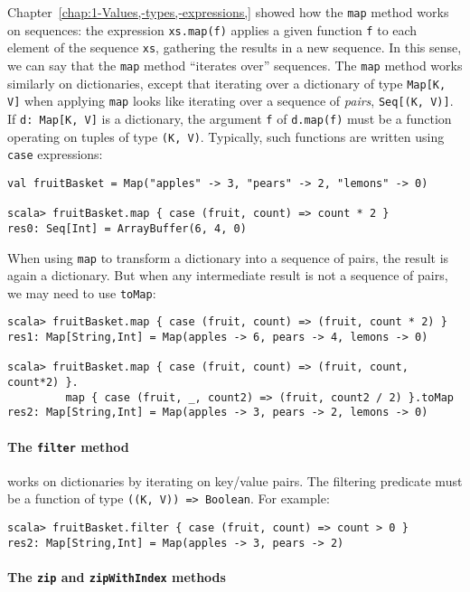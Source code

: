 Chapter~\ref{chap:1-Values,-types,-expressions,} showed how the
\lstinline!map! method works on sequences: the expression \lstinline!xs.map(f)!
applies a given function \lstinline!f! to each element of the sequence
\lstinline!xs!, gathering the results in a new sequence. In this
sense, we can say that the \lstinline!map! method \textsf{``}iterates over\textsf{''}
sequences. The \lstinline!map! method works similarly on dictionaries,
except that iterating over a dictionary of type \lstinline!Map[K, V]!
when applying \lstinline!map! looks like iterating over a sequence
of \emph{pairs}, \lstinline!Seq[(K, V)]!. If \lstinline!d: Map[K, V]!
is a dictionary, the argument \lstinline!f! of \lstinline!d.map(f)!
must be a function operating on tuples of type \lstinline!(K, V)!.
Typically, such functions are written using \lstinline!case! expressions:
\begin{lstlisting}
val fruitBasket = Map("apples" -> 3, "pears" -> 2, "lemons" -> 0)

scala> fruitBasket.map { case (fruit, count) => count * 2 }
res0: Seq[Int] = ArrayBuffer(6, 4, 0)
\end{lstlisting}
When using \lstinline!map! to transform a dictionary into a sequence
of pairs, the result is again a dictionary. But when any intermediate
result is not a sequence of pairs, we may need to use \lstinline!toMap!:
\begin{lstlisting}
scala> fruitBasket.map { case (fruit, count) => (fruit, count * 2) }
res1: Map[String,Int] = Map(apples -> 6, pears -> 4, lemons -> 0)

scala> fruitBasket.map { case (fruit, count) => (fruit, count, count*2) }.
         map { case (fruit, _, count2) => (fruit, count2 / 2) }.toMap
res2: Map[String,Int] = Map(apples -> 3, pears -> 2, lemons -> 0)
\end{lstlisting}


\paragraph*{The \texttt{filter} method }

works on dictionaries by iterating on key/value pairs. The filtering
predicate must be a function of type \lstinline!((K, V)) => Boolean!.
For example:
\begin{lstlisting}
scala> fruitBasket.filter { case (fruit, count) => count > 0 }
res2: Map[String,Int] = Map(apples -> 3, pears -> 2)
\end{lstlisting}


\paragraph*{The \texttt{zip} and \texttt{zipWithIndex} methods}

